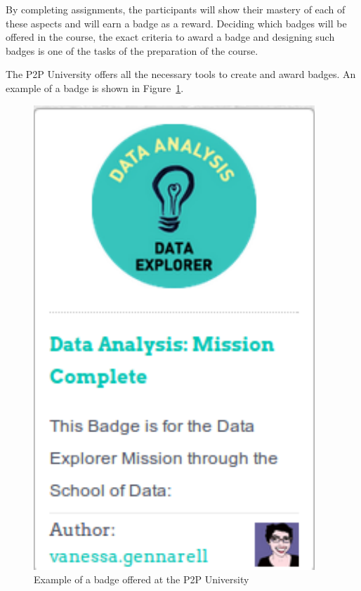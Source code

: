 \documentclass[a4paper,oneside]{book}   %
\begin{document}
By completing assignments, the participants will show their mastery of each of these aspects and will earn a badge as a reward.
Deciding which badges will be offered in the course, the exact criteria to award a badge and designing such badges is one of the tasks of the preparation of the course.


The P2P University offers all the necessary tools to create and award badges.
An example of a badge is shown in Figure~\ref{fig:badge}.



\begin{figure}
\begin{center}
\includegraphics[width=0.40\linewidth]{badge}
\caption{Example of a badge offered at the P2P University}
\label{fig:badge}
\end{center}
\end{figure}
\end{document}
